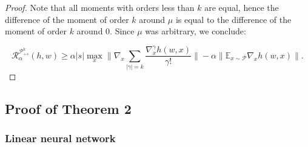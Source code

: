 \begin{proof}
Note that all moments with orders less than $k$ are equal, hence the difference of the moment of order $k$ around $\mu$ is equal to the difference of the moment of order $k$ around 0. Since $\mu$ was arbitrary, we conclude:

\[
\mathcal{R}^{\mathcal{P}^{k}_{+s}}_{\alpha}(h,w) \geq
\alpha |s| \max_{x} \| \nabla_x \sum_{|\gamma|=k} \frac{\nabla_x^{\gamma} h(w,x)}{\gamma!} \| -  \alpha \| \mathbb{E}_{x \sim \mathcal{P}} \nabla_x h(w,x) \|.
\]

\end{proof}

\subsection{Proof of Theorem 2}
\label{proof_th_2}
\subsubsection{Linear neural network}

